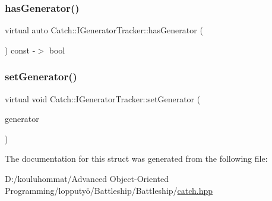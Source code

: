 \mbox{\label{struct_catch_1_1_i_generator_tracker_ae88084f9af27c8b9a5d5775b9c148498}} 
\subsubsection{\texorpdfstring{has\+Generator()}{hasGenerator()}}
{\footnotesize\ttfamily virtual auto Catch\+::\+I\+Generator\+Tracker\+::has\+Generator (\begin{DoxyParamCaption}{ }\end{DoxyParamCaption}) const -\/$>$  bool\hspace{0.3cm}{\ttfamily [pure virtual]}}

\mbox{\label{struct_catch_1_1_i_generator_tracker_a9945eff42219edc5a7071eebd8b0419e}} 
\subsubsection{\texorpdfstring{set\+Generator()}{setGenerator()}}
{\footnotesize\ttfamily virtual void Catch\+::\+I\+Generator\+Tracker\+::set\+Generator (\begin{DoxyParamCaption}\item[{\mbox{\hyperlink{namespace_catch_1_1_generators_a24d632802570d314c18d00a2ea5e33d1}{Generators\+::\+Generator\+Base\+Ptr}} \&\&}]{generator }\end{DoxyParamCaption})\hspace{0.3cm}{\ttfamily [pure virtual]}}



The documentation for this struct was generated from the following file\+:\begin{DoxyCompactItemize}
\item 
D\+:/kouluhommat/\+Advanced Object-\/\+Oriented Programming/lopputyö/\+Battleship/\+Battleship/\mbox{\hyperlink{catch_8hpp}{catch.\+hpp}}\end{DoxyCompactItemize}
